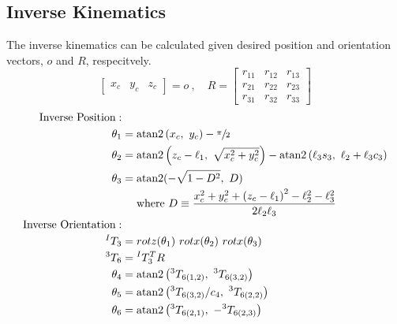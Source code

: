 \subsection{Inverse Kinematics}
The inverse kinematics can be calculated given desired position and orientation vectors, $o$ and $R$, respecitvely.
\[
\begin{bmatrix}x_c & y_c & z_c \end{bmatrix} = o~,\quad
  R =
  \begin{bmatrix}
    r_{11} & r_{12} & r_{13} \\
    r_{21} & r_{22} & r_{23} \\
    r_{31} & r_{32} & r_{33}
  \end{bmatrix}
\]
\begin{equation}
\begin{aligned}
\quad\text{Inverse Position}: \\
\theta_{1}&= \text{atan2} \left(x_{c},~ y_{c}\right) - \sfrac{\pi}{2}\\
\theta_{2}&= \text{atan2} \left(z_c - \ell_1, ~\sqrt{x_c^2 + y_c^2}\right) - \text{atan2}\left(\ell_3s_3,~\ell_2 + \ell_3c_3\right) \\
\theta_{3}&= \text{atan2} (-\sqrt{1-D^{2}},~ D) \\
& \quad \text { where } D\equiv\frac{x_{c}^{2}+y_{c}^{2}+\left(z_{c}-\ell_{1}\right)^{2}-\ell_{2}^{2}-\ell_{3}^{2}}{2 \ell_{2} \ell_{3}} \\
\quad\text{Inverse Orientation}:\\
^IT_3 &= rotz(\theta_1)~rotx(\theta_2)~rotx(\theta_3) \\
{}^3T_6 &= {}^IT_3^TR \\ %
\theta_4 &= \text{atan2} \left({}^3T_{6(1,2)},~{}^3T_{6(3,2)}\right) \\
\theta_5 &= \text{atan2} \left({{}^3T_{6(3,2)}} / {c_4},~{}^3T_{6(2,2)}\right) \\
\theta_6 &= \text{atan2} \left({}^3T_{6(2,1)},~ -{}^3T_{6(2,3)}\right) \\
\end{aligned}
\nonumber
\end{equation}
\newpage

